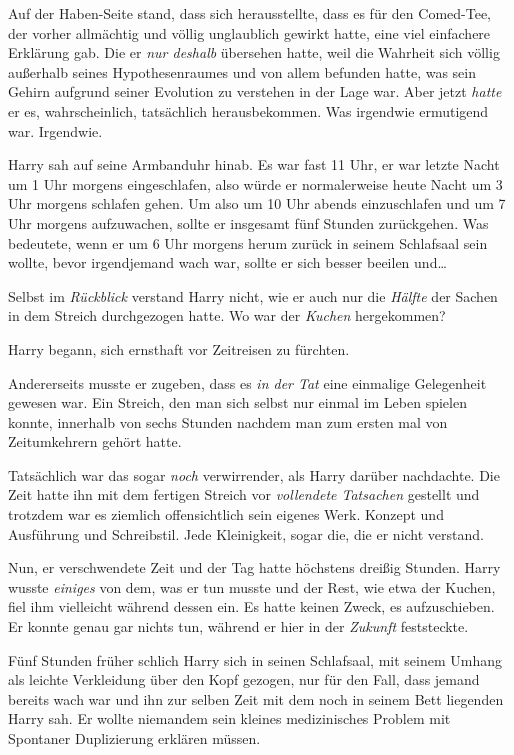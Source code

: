 {Auf der Haben-Seite stand, dass sich herausstellte, dass es für den Comed-Tee, der vorher allmächtig und völlig unglaublich gewirkt hatte, eine viel einfachere Erklärung gab. Die er \emph{nur deshalb} übersehen hatte, weil die Wahrheit sich völlig außerhalb seines Hypothesenraumes und von allem befunden hatte, was sein Gehirn aufgrund seiner Evolution zu verstehen in der Lage war. Aber jetzt \emph{hatte} er es, wahrscheinlich, tatsächlich herausbekommen. Was irgendwie ermutigend war. Irgendwie.

Harry sah auf seine Armbanduhr hinab. Es war fast 11 Uhr, er war letzte Nacht um 1 Uhr morgens eingeschlafen, also würde er normalerweise heute Nacht um 3 Uhr morgens schlafen gehen. Um also um 10 Uhr abends einzuschlafen und um 7 Uhr morgens aufzuwachen, sollte er insgesamt fünf Stunden zurückgehen. Was bedeutete, wenn er um 6 Uhr morgens herum zurück in seinem Schlafsaal sein wollte, bevor irgendjemand wach war, sollte er sich besser beeilen und…

Selbst im \emph{Rückblick} verstand Harry nicht, wie er auch nur die \emph{Hälfte} der Sachen in dem Streich durchgezogen hatte. Wo war der \emph{Kuchen} hergekommen?

Harry begann, sich ernsthaft vor Zeitreisen zu fürchten.

Andererseits musste er zugeben, dass es \emph{in der Tat} eine einmalige Gelegenheit gewesen war. Ein Streich, den man sich selbst nur einmal im Leben spielen konnte, innerhalb von sechs Stunden nachdem man zum ersten mal von Zeitumkehrern gehört hatte.

Tatsächlich war das sogar \emph{noch} verwirrender, als Harry darüber nachdachte. Die Zeit hatte ihn mit dem fertigen Streich vor \emph{vollendete Tatsachen} gestellt und trotzdem war es ziemlich offensichtlich sein eigenes Werk. Konzept und Ausführung und Schreibstil. Jede Kleinigkeit, sogar die, die er nicht verstand.

Nun, er verschwendete Zeit und der Tag hatte höchstens dreißig Stunden. Harry wusste \emph{einiges} von dem, was er tun musste und der Rest, wie etwa der Kuchen, fiel ihm vielleicht während dessen ein. Es hatte keinen Zweck, es aufzuschieben. Er konnte genau gar nichts tun, während er hier in der \emph{Zukunft} feststeckte.

\later

Fünf Stunden früher schlich Harry sich in seinen Schlafsaal, mit seinem Umhang als leichte Verkleidung über den Kopf gezogen, nur für den Fall, dass jemand bereits wach war und ihn zur selben Zeit mit dem noch in seinem Bett liegenden Harry sah. Er wollte niemandem sein kleines medizinisches Problem mit Spontaner Duplizierung erklären müssen.

}
